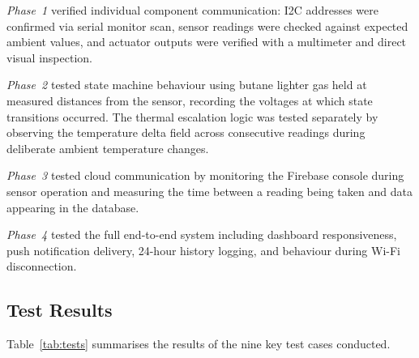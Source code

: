 \documentclass[a4paper,10pt,conference,onecolumn]{IEEEtran}
\begin{document}
\textit{Phase~1} verified individual component communication: I2C addresses
were confirmed via serial monitor scan, sensor readings were checked against
expected ambient values, and actuator outputs were verified with a multimeter
and direct visual inspection.

\textit{Phase~2} tested state machine behaviour using butane lighter gas held
at measured distances from the sensor, recording the voltages at which state
transitions occurred. The thermal escalation logic was tested separately by
observing the temperature delta field across consecutive readings during
deliberate ambient temperature changes.

\textit{Phase~3} tested cloud communication by monitoring the Firebase console
during sensor operation and measuring the time between a reading being taken
and data appearing in the database.

\textit{Phase~4} tested the full end-to-end system including dashboard
responsiveness, push notification delivery, 24-hour history logging, and
behaviour during Wi-Fi disconnection.

\subsection{Test Results}

Table~\ref{tab:tests} summarises the results of the nine key test cases
conducted.
\end{document}
